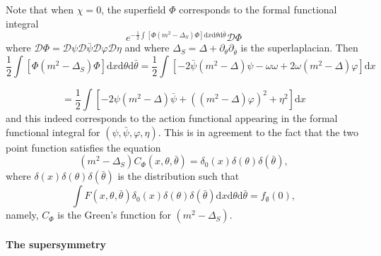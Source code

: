 \documentclass[a4paper,10pt]{article}
\newcommand{\mathd}{\mathrm{d}}
\begin{document}
\begin{remark}
  Note that when $\chi = 0$, the superfield $\Phi$ corresponds to the formal
  functional integral
  \[ e^{- \frac{1}{2} \int [\Phi (m^2 - \Delta_S) \Phi] \mathd x \mathd \theta
     \mathd \bar{\theta}} \mathcal{D} \Phi \]
  where $\mathcal{D} \Phi =\mathcal{D} \psi \mathcal{D} \bar{\psi} \mathcal{D}
  \varphi \mathcal{D} \eta$ and where $\Delta_S = \Delta + \partial_{\theta}
  \partial_{\bar{\theta}}$ is the superlaplacian. Then
  \[ \frac{1}{2} \int [\Phi (m^2 - \Delta_S) \Phi] \mathd x \mathd \theta
     \mathd \bar{\theta} = \frac{1}{2} \int [- 2 \bar{\psi} (m^2 - \Delta)
     \psi - \omega \omega + 2 \omega (m^2 - \Delta) \varphi] \mathd x \]
  
  \[ = \frac{1}{2} \int [- 2 \psi (m^2 - \Delta) \bar{\psi} + ((m^2 - \Delta)
     \varphi)^2 + \eta^2] \mathd x \]
  and this indeed corresponds to the action functional appearing in the formal
  functional integral for $(\psi, \bar{\psi}, \varphi, \eta)$. This is in
  agreement to the fact that the two point function satisfies the equation
  \[ (m^2 - \Delta_S) C_{\Phi} (x, \theta, \bar{\theta}) = \delta_0 (x) \delta
     (\theta) \delta (\bar{\theta}), \]
  where $\delta (x) \delta (\theta) \delta (\bar{\theta})$ is the distribution
  such that
  \[ \int F (x, \theta, \bar{\theta}) \delta_0 (x) \delta (\theta) \delta
     (\bar{\theta}) \mathd x \mathd \theta \mathd \bar{\theta} = f_{\emptyset}
     (0), \]
  namely, $C_{\Phi}$ is the Green's function for $(m^2 - \Delta_S)$.
\end{remark}

\paragraph{The supersymmetry}
\end{document}

